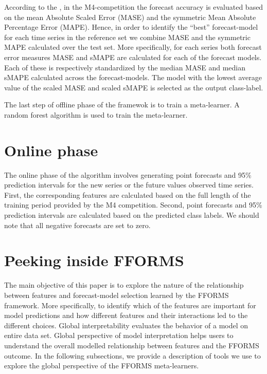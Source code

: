 \documentclass[11pt,a4paper,]{article}
\begin{document}
According to the \textcite{M4compguide}, in the M4-competition the
forecast accuracy is evaluated based on the mean Absolute Scaled Error
(MASE) and the symmetric Mean Absolute Percentage Error (MAPE). Hence,
in order to identify the ``best'' forecast-model for each time series in
the reference set we combine MASE and the symmetric MAPE calculated over
the test set. More specifically, for each series both forecast error
measures MASE and sMAPE are calculated for each of the forecast models.
Each of these is respectively standardized by the median MASE and median
sMAPE calculated across the forecast-models. The model with the lowest
average value of the scaled MASE and scaled sMAPE is selected as the
output class-label.

The last step of offline phase of the framewok is to train a
meta-learner. A random forest algorithm is used to train the
meta-learner.

\section{Online phase}\label{online}

The online phase of the algorithm involves generating point forecasts
and 95\% prediction intervals for the new series or the future values
observed time series. First, the corresponding features are calculated
based on the full length of the training period provided by the M4
competition. Second, point forecasts and 95\% prediction intervals are
calculated based on the predicted class labels. We should note that all
negative forecasts are set to zero.

\section{Peeking inside FFORMS}\label{peeking}

The main objective of this paper is to explore the nature of the
relationship between features and forecast-model selection learned by
the FFORMS framework. More specifically, to identify which of the
features are important for model predictions and how different features
and their interactions led to the different choices. Global
interpretability evaluates the behavior of a model on entire data set.
Global perspective of model interpretation helps users to understand the
overall modelled relationship between features and the FFORMS outcome.
In the following subsections, we provide a description of tools we use
to explore the global perspective of the FFORMS meta-learners.
\end{document}
